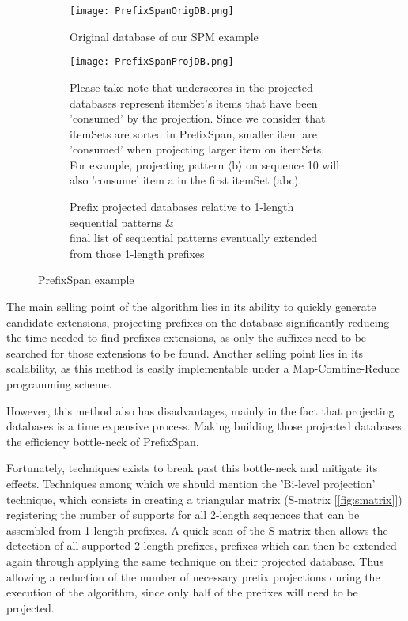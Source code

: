 \documentclass{eplmastersthesis}
\begin{document}
\begin{figure}[h]
  \centering
  \begin{subfigure}{\textwidth}
  	\centering
    \texttt{[image: PrefixSpanOrigDB.png]}
    \caption{Original database of our SPM example}
  \end{subfigure}
  \begin{subfigure}{\textwidth}
  	\centering
    \texttt{[image: PrefixSpanProjDB.png]}
    \caption[Prefix projected database \& sequential pattern]{
			Prefix projected databases relative to 1-length sequential patterns \& \\
			final list of sequential patterns eventually extended from those 1-length prefixes
		\endtabular
	}
	\vspace{5mm}
	Please take note that underscores in the projected databases represent itemSet's items that have been 'consumed' by the projection. Since we consider that itemSets are sorted in PrefixSpan, smaller item are 'consumed' when projecting larger item on itemSets. For example, projecting pattern $\langle$b$\rangle$ on sequence 10 will also 'consume' item a in the first itemSet (abc).
  \end{subfigure}
  \caption{PrefixSpan example}
  \label{ex:PrefixSpanExample}
\end{figure}

The main selling point of the algorithm lies in its ability to quickly generate candidate extensions, projecting prefixes on the database significantly reducing the time needed to find prefixes extensions, as only the suffixes need to be searched for those extensions to be found. Another selling point lies in its scalability, as this method is easily implementable under a Map-Combine-Reduce programming scheme. \newline

However, this method also has disadvantages, mainly in the fact that projecting databases is a time expensive process. Making building those projected databases the efficiency bottle-neck of PrefixSpan. \newline

Fortunately, techniques exists to break past this bottle-neck and mitigate its effects. Techniques among which we should mention the 'Bi-level projection' technique, which consists in creating a triangular matrix (S-matrix [\ref{fig:smatrix}]) registering the number of supports for all 2-length sequences that can be assembled from 1-length prefixes. A quick scan of the S-matrix then allows the detection of all supported 2-length prefixes, prefixes which can then be extended again through applying the same technique on their projected database. Thus allowing a reduction of the number of necessary prefix projections during the execution of the algorithm, since only half of the prefixes will need to be projected. \newline
\end{document}
